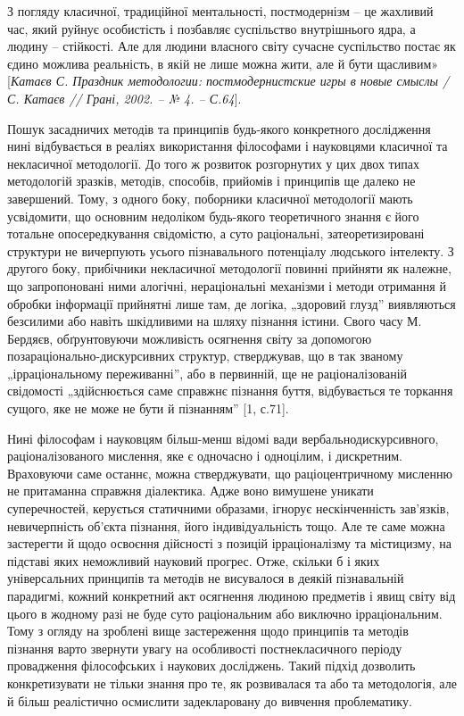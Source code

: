 З погляду класичної, традиційної ментальності, постмодернізм – це
жахливий час, який руйнує особистість і позбавляє суспільство внутрішнього
ядра, а людину – стійкості. Але для людини власного світу сучасне суспільство
постає як єдино можлива реальність, в якій не лише можна жити, але й бути
щасливим» [\textit{Катаєв С. Праздник методологии: постмодернистские игры в
новые смыслы / С. Катаєв // Грані, 2002. – № 4. – С.64}].

Пошук засадничих методів та принципів будь-якого конкретного
дослідження нині відбувається в реаліях використання філософами і
науковцями класичної та некласичної методології. До того ж розвиток
розгорнутих у цих двох типах методологій зразків, методів, способів, прийомів
і принципів ще далеко не завершений. Тому, з одного боку, поборники
класичної методології мають усвідомити, що основним недоліком будь-якого
теоретичного знання є його тотальне опосередкування свідомістю, а суто
раціональні, затеоретизировані структури не вичерпують усього пізнавального
потенціалу людського інтелекту. З другого боку, прибічники некласичної
методології повинні прийняти як належне, що запропоновані ними алогічні,
нераціональні механізми і методи отримання й обробки інформації прийнятні
лише там, де логіка, „здоровий глузд” виявляються безсилими або навіть
шкідливими на шляху пізнання істини. Свого часу М. Бердяєв, обґрунтовуючи
можливість осягнення світу за допомогою позараціонально-дискурсивних
структур, стверджував, що в так званому „ірраціональному переживанні”, або в
первинній, ще не раціоналізованій свідомості „здійснюється саме справжнє
пізнання буття, відбувається те торкання сущого, яке не може не бути й
пізнанням” [1, с.71].

Нині філософам і науковцям більш-менш відомі вади вербальнодискурсивного, раціоналізованого мислення, яке є одночасно і одноцілим, і
дискретним. Враховуючи саме останнє, можна стверджувати, що
раціоцентричному мисленню не притаманна справжня діалектика. Адже воно
вимушене уникати суперечностей, керується статичними образами, ігнорує
нескінченність зав’язків, невичерпність об’єкта пізнання, його індивідуальність
тощо. Але те саме можна застерегти й щодо освоєння дійсності з позицій
ірраціоналізму та містицизму, на підставі яких неможливий науковий прогрес.
Отже, скільки б і яких універсальних принципів та методів не висувалося в
деякій пізнавальній парадигмі, кожний конкретний акт осягнення людиною
предметів і явищ світу від цього в жодному разі не буде суто раціональним або
виключно ірраціональним. Тому з огляду на зроблені вище застереження щодо
принципів та методів пізнання варто звернути увагу на особливості
постнекласичного періоду провадження філософських і наукових досліджень.
Такий підхід дозволить конкретизувати не тільки знання про те, як розвивалася
та або та методологія, але й більш реалістично осмислити задекларовану до
вивчення проблематику.

